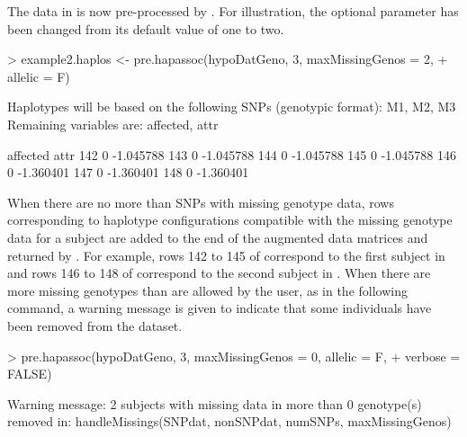 \documentclass[article, shortnames]{jss}
\begin{document}
The data in  is now pre-processed by . 
For illustration, the optional parameter  
has been changed from its default value of one to two.

\begin{Schunk}
\begin{Sinput}
> example2.haplos <- pre.hapassoc(hypoDatGeno, 3, maxMissingGenos = 2, 
+     allelic = F)
\end{Sinput}
\begin{Soutput}
Haplotypes will be based on the following SNPs (genotypic format): 
 M1, M2, M3 
Remaining variables are: 
 affected, attr 
\end{Soutput}
\begin{Soutput}
    affected      attr
142        0 -1.045788
143        0 -1.045788
144        0 -1.045788
145        0 -1.045788
146        0 -1.360401
147        0 -1.360401
148        0 -1.360401
\end{Soutput}
\end{Schunk}

When there are no more than  SNPs with missing 
genotype data, rows corresponding to haplotype configurations compatible
with the missing genotype data for a subject are added to the end of the 
augmented data matrices  and  returned by 
. For example, rows 142 to 145 of  
correspond to the first subject in  and rows 146 to 148
of  correspond to the second subject in .
When there are more missing genotypes than 
are allowed by the user, as in the following command, a warning 
message is given to indicate that some individuals have been removed from 
the dataset. 

\begin{Schunk}
\begin{Sinput}
> pre.hapassoc(hypoDatGeno, 3, maxMissingGenos = 0, allelic = F, 
+     verbose = FALSE)
\end{Sinput}
\end{Schunk}
\begin{Code}
Warning message:
2 subjects with missing data in more than 0 genotype(s) removed
 in: handleMissings(SNPdat, nonSNPdat, numSNPs, maxMissingGenos)
\end{Code}
\end{document}
